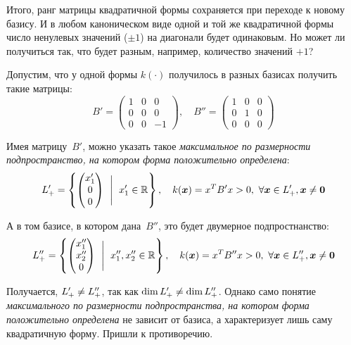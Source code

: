 \documentclass[a4paper,12pt]{article}
\begin{document}
  Итого, ранг матрицы квадратичной формы сохраняется при переходе к новому базису.
  И в любом каноническом виде одной и той же квадратичной формы число ненулевых значений ($\pm 1$) на диагонали будет одинаковым.
  Но может ли получиться так, что будет разным, например, количество значений $+1$?
  
  \begin{example}
    Допустим, что у одной формы $k(\cdot)$ получилось в разных базисах получить такие матрицы:
    \[
      B' = \begin{pmatrix}
        1 & 0 & 0\\
        0 & 0 & 0\\
        0 & 0 & -1
      \end{pmatrix},\quad B'' = \begin{pmatrix}
        1 & 0 & 0\\
        0 & 1 & 0\\
        0 & 0 & 0
      \end{pmatrix}
    \]
    
    Имея матрицу~$B'$, можно указать такое \emph{максимальное по размерности подпространство, на котором форма положительно определена}:
    \[
      L'_{+} = \left\{
        \begin{pmatrix}
          x_1'\\
          0\\
          0
        \end{pmatrix}\ \Biggm|\ x_1' \in \operatorname{\mathbb R}
      \right\},\quad k(\boldsymbol x) = x^T B' x > 0,\ \forall \boldsymbol x \in L'_{+}, \boldsymbol x \not= \boldsymbol 0
    \]
    
    А в том базисе, в котором дана~$B''$, это будет двумерное подпростнанство:
    \[
      L''_{+} = \left\{
        \begin{pmatrix}
          x_1''\\
          x_2''\\
          0
        \end{pmatrix}\ \Biggm|\ x_1'', x_2'' \in \operatorname{\mathbb R}
      \right\},\quad k(\boldsymbol x) = x^T B'' x > 0,\ \forall \boldsymbol x \in L''_{+}, \boldsymbol x \not= \boldsymbol 0
    \]
    
    Получается, $L'_{+} \hm{\not=} L''_{+}$, так как $\dim L'_{+} \hm{\not=} \dim L''_{+}$.
    Однако само понятие \emph{максимального по размерности подпространства, на котором форма положительно определена} не зависит от базиса, а характеризует лишь саму квадратичную форму.
    Пришли к противоречию.
  \end{example}
  
\end{document}

